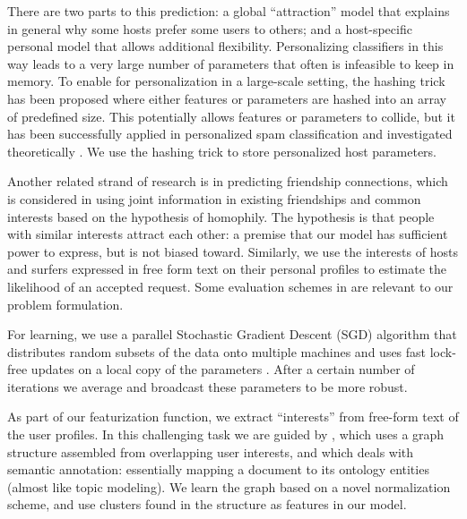 There are two parts to this prediction: a global ``attraction'' model that explains in general why some hosts prefer some users to others; and a host-specific personal model that allows additional flexibility.
Personalizing classifiers in this way leads to a very large number of parameters that often is infeasible to keep in memory.
To enable for personalization in a large-scale setting, the hashing trick has been proposed where either features or parameters are hashed into an array of predefined size.
This potentially allows features or parameters to collide, but it has been successfully applied in personalized spam classification \cite{Attenberg2009} and investigated theoretically \cite{Weinberger2012}.
We use the hashing trick to store personalized host parameters.

Another related strand of research is in predicting friendship connections, which is considered in \cite{Yang2011} using joint information in existing friendships and common interests based on the hypothesis of homophily.
The hypothesis is that people with similar interests attract each other: a premise that our model has sufficient power to express, but is not biased toward.
Similarly, we use the interests of hosts and surfers expressed in free form text on their personal profiles to estimate the likelihood of an accepted request.
Some evaluation schemes in \cite{Yang2011} are relevant to our problem formulation.

For learning, we use a parallel Stochastic Gradient Descent (SGD) algorithm that distributes random subsets of the data onto multiple machines and uses fast lock-free updates on a local copy of the parameters \cite{Zinkevich2010}. After a certain number of iterations we average and broadcast these parameters to be more robust.

As part of our featurization function, we extract ``interests'' from free-form text of the user profiles.
In this challenging task we are guided by \cite{Liu2005}, which uses a graph structure assembled from overlapping user interests, and \cite{Cantador2011} which deals with semantic annotation: essentially mapping a document to its ontology entities (almost like topic modeling).
We learn the graph based on a novel normalization scheme, and use clusters found in the structure as features in our model.


